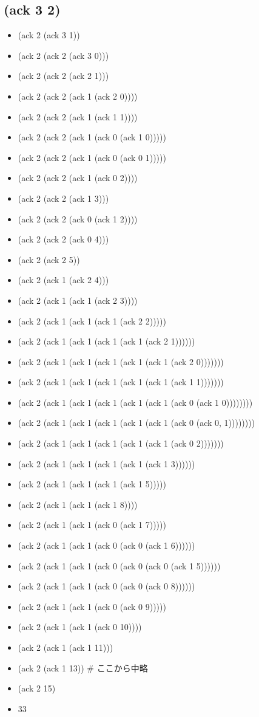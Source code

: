 \documentclass[a4paper,12pt]{article}
\begin{document}
\subsection{(ack 3 2)}
\begin{itemize}
    \item (ack 2 (ack 3 1))
    \item (ack 2 (ack 2 (ack 3 0)))
    \item (ack 2 (ack 2 (ack 2 1)))
    \item (ack 2 (ack 2 (ack 1 (ack 2 0))))
    \item (ack 2 (ack 2 (ack 1 (ack 1 1))))
    \item (ack 2 (ack 2 (ack 1 (ack 0 (ack 1 0)))))
    \item (ack 2 (ack 2 (ack 1 (ack 0 (ack 0 1)))))
    \item (ack 2 (ack 2 (ack 1 (ack 0 2))))
    \item (ack 2 (ack 2 (ack 1 3)))
    \item (ack 2 (ack 2 (ack 0 (ack 1 2))))
    \item (ack 2 (ack 2 (ack 0 4)))
    \item (ack 2 (ack 2 5))
    \item (ack 2 (ack 1 (ack 2 4)))
    \item (ack 2 (ack 1 (ack 1 (ack 2 3))))
    \item (ack 2 (ack 1 (ack 1 (ack 1 (ack 2 2)))))
    \item (ack 2 (ack 1 (ack 1 (ack 1 (ack 1 (ack 2 1))))))
    \item (ack 2 (ack 1 (ack 1 (ack 1 (ack 1 (ack 1 (ack 2 0)))))))
    \item (ack 2 (ack 1 (ack 1 (ack 1 (ack 1 (ack 1 (ack 1 1)))))))
    \item (ack 2 (ack 1 (ack 1 (ack 1 (ack 1 (ack 1 (ack 0 (ack 1 0))))))))
    \item (ack 2 (ack 1 (ack 1 (ack 1 (ack 1 (ack 1 (ack 0 (ack 0, 1))))))))
    \item (ack 2 (ack 1 (ack 1 (ack 1 (ack 1 (ack 1 (ack 0 2)))))))
    \item (ack 2 (ack 1 (ack 1 (ack 1 (ack 1 (ack 1 3))))))
    \item (ack 2 (ack 1 (ack 1 (ack 1 (ack 1 5)))))
    \item (ack 2 (ack 1 (ack 1 (ack 1 8))))
    \item (ack 2 (ack 1 (ack 1 (ack 0 (ack 1 7)))))
    \item (ack 2 (ack 1 (ack 1 (ack 0 (ack 0 (ack 1 6))))))
    \item (ack 2 (ack 1 (ack 1 (ack 0 (ack 0 (ack 0 (ack 1 5))))))
    \item (ack 2 (ack 1 (ack 1 (ack 0 (ack 0 (ack 0 8))))))
    \item (ack 2 (ack 1 (ack 1 (ack 0 (ack 0 9)))))
    \item (ack 2 (ack 1 (ack 1 (ack 0 10))))
    \item (ack 2 (ack 1 (ack 1 11)))
    \item (ack 2 (ack 1 13)) \# ここから中略
    \item (ack 2 15)
    \item 33
\end{itemize}
\end{document}
